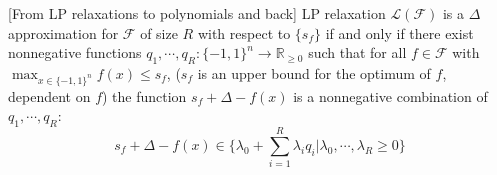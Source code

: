 \begin{theorem}\label{theorem_polytope_polynomials}[From LP relaxations to polynomials and back]  LP relaxation $\mathcal{L}(\mathcal{F})$ is a $\Delta$ approximation for $\mathcal{F}$ of size $R$ with respect to $\{s_f\}$ if and only if there exist nonnegative functions $q_1, \cdots, q_R : \{-1,1\}^n \rightarrow \mathbb{R}_{\geq 0}$ such that for all $f \in \mathcal{F}$ with $\max_{x \in \{-1,1\}^n} f(x) \leq s_f$, ($s_f$ is an upper bound for the optimum of $f$, dependent on $f$) the function $s_f + \Delta -f(x)$ is a nonnegative combination of $q_1, \cdots, q_R$:
\begin{equation}
s_f + \Delta - f(x) \in \{\lambda_0 + \sum_{i=1}^R \lambda_i q_i  | \lambda_0, \cdots, \lambda_R \geq 0 \}
\end{equation}

\end{theorem}

